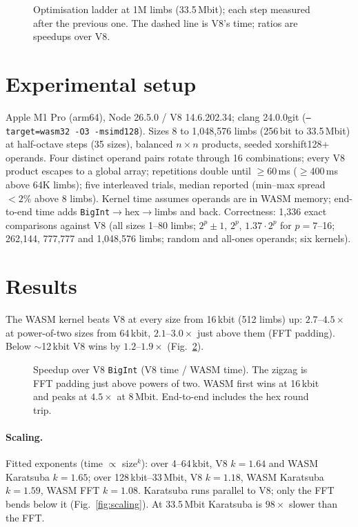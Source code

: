 \documentclass[10pt,twocolumn]{article}
\begin{document}
\begin{figure}[t]
\centering

\caption{Optimisation ladder at 1M limbs (33.5\,Mbit); each step measured after the
previous one. The dashed line is V8's time; ratios are speedups over V8.}
\label{fig:ladder}
\end{figure}

\section{Experimental setup}
Apple M1 Pro (arm64), Node 26.5.0 / V8 14.6.202.34; clang 24.0.0git
(\texttt{--target=wasm32 -O3 -msimd128}). Sizes 8 to 1,048,576 limbs (256\,bit to
33.5\,Mbit) at half-octave steps (35 sizes), balanced $n\times n$ products, seeded
xorshift128+ operands. Four distinct operand pairs rotate through 16 combinations; every
V8 product escapes to a global array; repetitions double until $\ge$60\,ms ($\ge$400\,ms
above 64K limbs); five interleaved trials, median reported (min--max spread $<2\%$ above
8 limbs). Kernel time assumes operands are in WASM memory; end-to-end time adds
\texttt{BigInt}$\to$hex$\to$limbs and back. Correctness: 1,336 exact comparisons against
V8 (all sizes 1--80 limbs; $2^p\pm1$, $2^p$, $1.37\cdot2^p$ for $p=7$--16; 262,144,
777,777 and 1,048,576 limbs; random and all-ones operands; six kernels).

\section{Results}
The WASM kernel beats V8 at every size from 16\,kbit (512 limbs) up:
$2.7$--$4.5\times$ at power-of-two sizes from 64\,kbit, $2.1$--$3.0\times$ just above them
(FFT padding). Below $\sim$12\,kbit V8 wins by $1.2$--$1.9\times$
(Fig.~\ref{fig:speedup}).

\begin{figure}[t]
\centering

\caption{Speedup over V8 \texttt{BigInt} (V8 time / WASM time). The zigzag is FFT
padding just above powers of two. WASM first wins at 16\,kbit and peaks at $4.5\times$
at 8\,Mbit. End-to-end includes the hex round trip.}
\label{fig:speedup}
\end{figure}

\paragraph{Scaling.} Fitted exponents (time $\propto$ size$^k$): over 4--64\,kbit, V8
$k=1.64$ and WASM Karatsuba $k=1.65$; over 128\,kbit--33\,Mbit, V8 $k=1.18$, WASM
Karatsuba $k=1.59$, WASM FFT $k=1.08$. Karatsuba runs parallel to V8; only the FFT bends
below it (Fig.~\ref{fig:scaling}). At 33.5\,Mbit Karatsuba is $98\times$ slower than the FFT.
\end{document}
